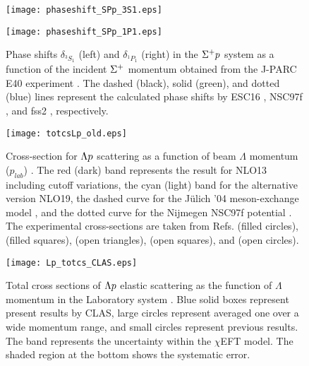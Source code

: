 \begin{figure}[!h]
  \begin{minipage}[t]{0.48\columnwidth}
    \centering
    \texttt{[image: phaseshift\_SPp\_3S1.eps]}
  \end{minipage}
  \hspace{0.04\columnwidth} %
  \begin{minipage}[t]{0.48\columnwidth}
    \centering
    \texttt{[image: phaseshift\_SPp\_1P1.eps]}
  \end{minipage}
  \caption{Phase shifts $\delta_{^3S_1}$ (left) and $\delta_{^1P_1}$ (right) in the $\Sigma^{+}p$ system as a function of the incident $\Sigma^{+}$ momentum obtained from the J-PARC E40 experiment \cite{Nana-SPp}. The dashed (black), solid (green), and dotted (blue) lines represent the calculated phase shifts by ESC16 \cite{ESC16}, NSC97f \cite{OBE-1999}, and fss2 \cite{Fujiwara-2007}, respectively.}
  \label{fig-phaseshift_SPp}
\end{figure}

%
\begin{figure}[h!]
 \begin{center}
   \texttt{[image: totcsLp\_old.eps]}
   \caption{Cross-section for $\Lambda p$ scattering as a function of beam $\Lambda$ momentum ($p_{lab}$) \cite{chiEFT-2020}. The red (dark) band represents the result for NLO13 \cite{NLO13} including cutoff variations, the cyan (light) band for the alternative version NLO19, the dashed curve for the J\"{u}lich '04 meson-exchange model \cite{Julich04}, and the dotted curve for the Nijmegen NSC97f potential \cite{NSC97f}. The experimental cross-sections are taken from Refs. \cite{Lp-1968_Sechi} (filled circles), \cite{Lp-1968_Alex} (filled squares), \cite{Lp-1967_Herndon} (open triangles), \cite{Lp-1971} (open squares), and \cite{Lp-1977_Hauptman} (open circles).}
   \label{fig-totcsLp_old}
 \end{center}
\end{figure}

\begin{figure}[h!]
 \begin{center}
   \texttt{[image: Lp\_totcs\_CLAS.eps]}
   \caption{Total cross sections of $\Lambda p$ elastic scattering as the function of $\Lambda$ momentum in the Laboratory system  \cite{Lp-2021}. Blue solid boxes represent present results by CLAS, large circles represent averaged one over a wide momentum range, and small circles represent previous results. The band represents the uncertainty within the $\chi$EFT model. The shaded region at the bottom shows the systematic error.}
   \label{fig-Lp_totcs_CLAS}
 \end{center}
\end{figure}

